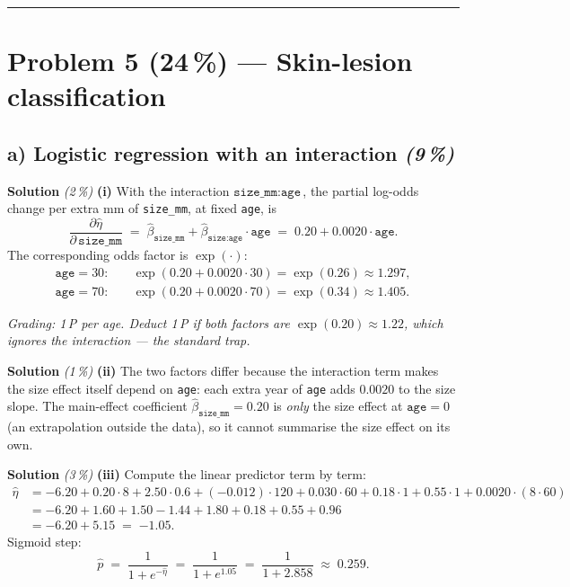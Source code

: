\documentclass[11pt,a4paper]{article}
\newcommand{\points}[1]{\textbf{(#1\,\%)}}
\newcommand{\subpoints}[1]{\textit{(#1\,\%)}}
\newcommand{\sol}{\noindent\textbf{Solution}}
\begin{document}
\vspace{0.6em}
\hrule
\vspace{1em}

\section*{Problem 5 \points{24} --- Skin-lesion classification}

\subsection*{a) Logistic regression with an interaction \subpoints{9}}

\sol{} \subpoints{2} \textbf{(i)} With the interaction $\texttt{size\_mm}\!:\!\texttt{age}$, the
partial log-odds change per extra mm of \texttt{size\_mm}, at fixed \texttt{age}, is
$$\frac{\partial \hat\eta}{\partial\,\texttt{size\_mm}}
   \;=\; \hat\beta_{\texttt{size\_mm}} + \hat\beta_{\texttt{size}:\texttt{age}}\cdot \texttt{age}
   \;=\; 0.20 + 0.0020\cdot\texttt{age}.$$
The corresponding odds factor is $\exp(\cdot)$:
\begin{align*}
\texttt{age} = 30: &\quad \exp(0.20 + 0.0020\cdot 30) = \exp(0.26) \approx \boxed{1.297}, \\
\texttt{age} = 70: &\quad \exp(0.20 + 0.0020\cdot 70) = \exp(0.34) \approx \boxed{1.405}.
\end{align*}

\noindent\emph{Grading: 1\,P per age. Deduct 1\,P if both factors are $\exp(0.20)\approx 1.22$,
which ignores the interaction --- the standard trap.}

\medskip
\sol{} \subpoints{1} \textbf{(ii)} The two factors differ because the interaction term makes
the size effect itself depend on \texttt{age}: each extra year of \texttt{age} adds $0.0020$ to
the size slope. The main-effect coefficient $\hat\beta_{\texttt{size\_mm}} = 0.20$ is \emph{only}
the size effect at $\texttt{age}=0$ (an extrapolation outside the data), so it cannot summarise
the size effect on its own.

\medskip
\sol{} \subpoints{3} \textbf{(iii)} Compute the linear predictor term by term:
\begin{align*}
\hat\eta &= -6.20
   + 0.20\cdot 8
   + 2.50\cdot 0.6
   + (-0.012)\cdot 120
   + 0.030\cdot 60
   + 0.18\cdot 1
   + 0.55\cdot 1
   + 0.0020\cdot (8\cdot 60) \\
&= -6.20 + 1.60 + 1.50 - 1.44 + 1.80 + 0.18 + 0.55 + 0.96 \\
&= -6.20 + 5.15 \;=\; \boxed{-1.05}.
\end{align*}
Sigmoid step:
$$\hat p \;=\; \frac{1}{1 + e^{-\hat\eta}} \;=\; \frac{1}{1 + e^{1.05}}
   \;=\; \frac{1}{1 + 2.858} \;\approx\; \boxed{0.259}.$$
\end{document}
